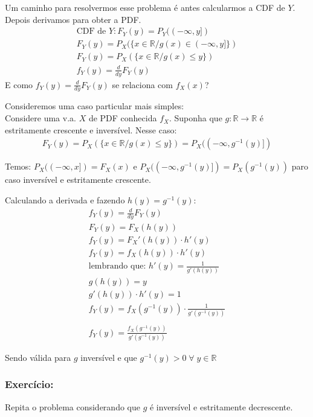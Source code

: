 \documentclass{article}
\newcommand{\bb}[1]{\mathbb{#1}}
\begin{document}
Um caminho para resolvermos esse problema é antes calcularmos a CDF de $Y$. Depois derivamos para
obter a PDF.
\begin{align*}
    \text{CDF de }Y: F_Y(y) = P_Y((-\infty, y]) \\
    F_Y(y) = P_X(\{x \in \bb{R}/ g(x) \in (-\infty,y]\}) \\
    F_Y(y) = P_X(\{x \in \bb{R}/ g(x) \leq y\}) \\
    f_Y(y) = \frac{d}{dy}F_Y(y)
\end{align*}
E como $f_Y(y) = \frac{d}{dy}F_Y(y)$ se relaciona com $f_X(x)$?

Consideremos uma caso particular mais simples:
\\
Considere uma v.a. $X$ de PDF conhecida $f_X$. Suponha que $g: \bb{R} \rightarrow \bb{R}$ é
estritamente crescente e inversível. Nesse caso:
\begin{align*}
    F_Y(y) = P_X(\{x \in \bb{R}/ g(x) \leq y\}) = P_X((-\infty, g^{-1}(y)])
\end{align*}

Temos: $P_X((-\infty,x]) = F_X(x)$ e $P_X((-\infty,g^{-1}(y)]) = P_X(g^{-1}(y))$ paro caso
inversível e estritamente crescente.

Calculando a derivada e fazendo $h(y) = g^{-1}(y)$:
\begin{align*}
    f_Y(y) = \frac{d}{dy}F_Y(y) \\
    F_Y(y) = F_X(h(y)) \\
    f_Y(y) = F_X'(h(y)) \cdot h'(y) \\
    f_Y(y) = f_X(h(y)) \cdot h'(y) \\
    \text{lembrando que: } h'(y) = \frac{1}{g'(h(y))} \\
    g(h(y)) = y \\
    g'(h(y)) \cdot h'(y) = 1 \\
    f_Y(y) = f_X(g^{-1}(y)) \cdot \frac{1}{g'(g^{-1}(y))} \\
    \\
    f_Y(y) = \frac{f_X(g^{-1}(y))}{g'(g^{-1}(y))}
\end{align*}

Sendo válida para $g$ inversível e que $g^{-1}(y) > 0 \; \forall \; y \in \bb{R}$

\subsubsection*{Exercício:}
Repita o problema considerando que $g$ é inversível e estritamente decrescente.
\end{document}
